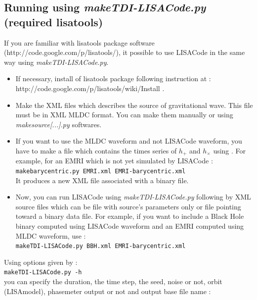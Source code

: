 \documentclass[a4paper,english,12pt]{article}
\begin{document}
\subsection{Running using { \it makeTDI-LISACode.py} (required lisatools)}
If you are familiar with lisatools package software (http://code.google.com/p/lisatools/), it possible to use LISACode in the same way using { \it makeTDI-LISACode.py}. 
\begin{itemize}
\item If necessary, install of lisatools package following instruction at : \\ http://code.google.com/p/lisatools/wiki/Install . 
\item Make the XML files which describes the source of gravitational wave. This file must be in XML MLDC format. You can make them manually or using {\it makesource[...].py} softwares.
\item If you want to use the MLDC waveform and not LISACode waveform, you have to make a file which contains the times series of $h_{+} $ and $h_{\times}$ using  . For example, for an EMRI which is not yet simulated by LISACode : \\
\hphantom{aaa}\texttt{makebarycentric.py EMRI.xml EMRI-barycentric.xml} \\
It produces a new XML file associated with a binary file.
\item Now, you can run LISACode using { \it makeTDI-LISACode.py} following by XML source files which can be file with source's parameters only or  file pointing toward a binary data file. For example, if you want to include a Black Hole binary computed using LISACode waveform and an EMRI computed using MLDC waveform, use : \\
\hphantom{aaa}\texttt{makeTDI-LISACode.py  BBH.xml EMRI-barycentric.xml} \\
\end{itemize}
Using options given by : \\
\hphantom{aaa}\texttt{makeTDI-LISACode.py  -h} \\
you can specify the duration, the time step, the seed, noise or not, orbit (LISAmodel), phasemeter output or not and output base file name :
\end{document}
